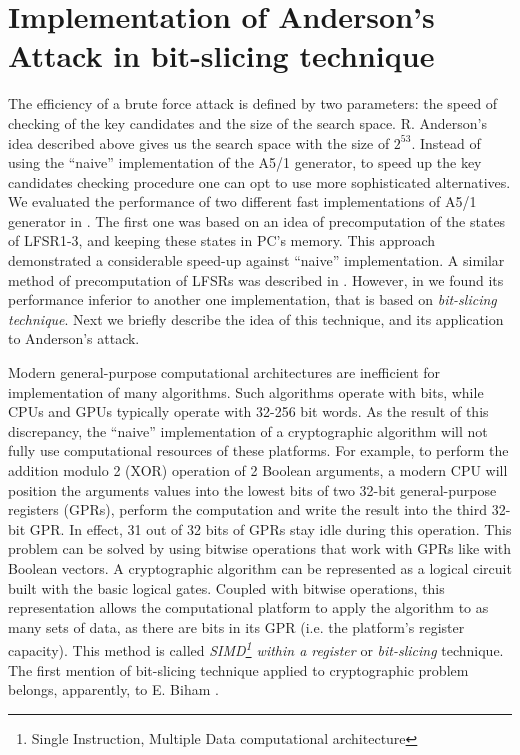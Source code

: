 \documentclass[runningheads,a4paper]{llncs}[2015/06/24]
\begin{document}
\section{Implementation of Anderson's Attack in bit-slicing technique}
\label{sec:bitslc}

The efficiency of a brute force attack is defined by two parameters: the speed
of checking of the key candidates and the size of the search space. R. Anderson's idea described above gives us the search space with the size of $2^{53}$. 
Instead of using the ``naive'' implementation of the A5/1 generator, to speed up the key candidates checking procedure one can opt to use more
sophisticated alternatives. We evaluated the performance of two different fast
implementations of A5/1 generator in \cite{BulavintsevS2016}. The first one was based
on an idea of precomputation of the states of LFSR1-3, and
keeping these states in PC's memory. This approach demonstrated a considerable speed-up against ``naive'' implementation. A similar
method of precomputation of LFSRs was described in \cite{DBLP:conf/fse/BiryukovSW00}. However, in
\cite{BulavintsevS2016} we found its performance inferior to another one implementation, 
that is based on \textit{bit-slicing technique}.
Next we briefly describe the idea of this technique, and its application to Anderson's attack.

Modern general-purpose computational architectures are inefficient for
implementation of many algorithms. Such algorithms operate with bits, while CPUs and
GPUs typically operate with 32-256 bit words. As the result of this
discrepancy, the ``naive'' implementation of a cryptographic algorithm will not 
fully use computational resources of these platforms. For example, to perform the
addition modulo 2 (XOR) operation of 2 Boolean arguments, a modern CPU will
position the arguments values into the lowest bits of two 32-bit
general-purpose registers (GPRs), perform the computation and write the result
into the third 32-bit GPR. In effect, 31 out of 32 bits of GPRs stay idle
during this operation. This problem can be solved by using bitwise operations
that work with GPRs like with Boolean vectors. A cryptographic
algorithm can be represented as a logical circuit built with the
basic logical gates. Coupled with bitwise operations, this representation
allows the computational platform to apply the algorithm to as many sets of
data, as there are bits in its GPR (i.e. the platform's register capacity).
This method is called \textit{SIMD\footnote{Single Instruction, 
Multiple Data computational architecture} within a register} or \textit{bit-slicing} technique. 
The first mention of bit-slicing technique applied to cryptographic problem belongs, apparently, to E. Biham \cite{DBLP:conf/fse/Biham97a}.
\end{document}

